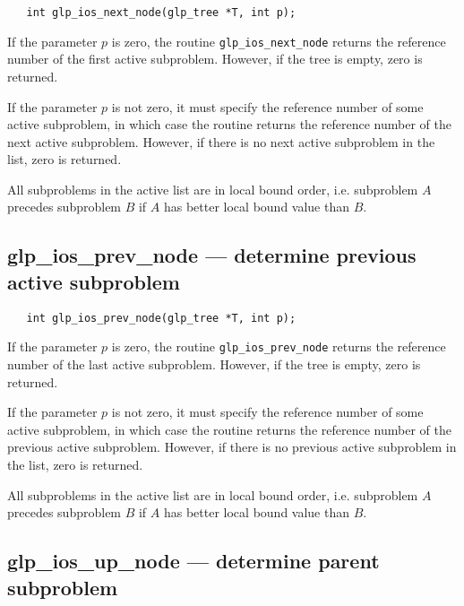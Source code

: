 \synopsis

\begin{verbatim}
   int glp_ios_next_node(glp_tree *T, int p);
\end{verbatim}

\returns

If the parameter $p$ is zero, the routine \verb|glp_ios_next_node|
returns the reference number of the first active subproblem. However,
if the tree is empty, zero is returned.

If the parameter $p$ is not zero, it must specify the reference number
of some active subproblem, in which case the routine returns the
reference number of the next active subproblem. However, if there is
no next active subproblem in the list, zero is returned.

All subproblems in the active list are in local bound order, i.e.
subproblem $A$ precedes subproblem $B$ if $A$ has better local bound
value than $B$.

\newpage

\subsection{glp\_ios\_prev\_node --- determine previous active
subproblem}

\synopsis

\begin{verbatim}
   int glp_ios_prev_node(glp_tree *T, int p);
\end{verbatim}

\returns

If the parameter $p$ is zero, the routine \verb|glp_ios_prev_node|
returns the reference number of the last active subproblem. However, if
the tree is empty, zero is returned.

If the parameter $p$ is not zero, it must specify the reference number
of some active subproblem, in which case the routine returns the
reference number of the previous active subproblem. However, if there
is no previous active subproblem in the list, zero is returned.

All subproblems in the active list are in local bound order, i.e.
subproblem $A$ precedes subproblem $B$ if $A$ has better local bound
value than $B$.

\subsection{glp\_ios\_up\_node --- determine parent subproblem}

